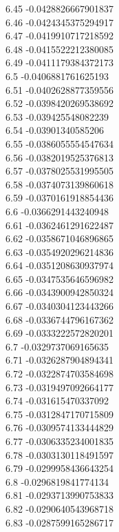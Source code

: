{6.45	-0.0428826667901837\\
6.46	-0.0424345375294917\\
6.47	-0.0419910717218592\\
6.48	-0.0415522212380085\\
6.49	-0.0411179384372173\\
6.5	-0.0406881761625193\\
6.51	-0.0402628877359556\\
6.52	-0.0398420269538692\\
6.53	-0.039425548082239\\
6.54	-0.03901340585206\\
6.55	-0.0386055554547634\\
6.56	-0.0382019525376813\\
6.57	-0.0378025531995505\\
6.58	-0.0374073139860618\\
6.59	-0.0370161918854436\\
6.6	-0.0366291443240948\\
6.61	-0.0362461291622487\\
6.62	-0.0358671046896865\\
6.63	-0.0354920296214836\\
6.64	-0.0351208630937974\\
6.65	-0.0347535646596982\\
6.66	-0.0343900942850324\\
6.67	-0.0340304123443266\\
6.68	-0.0336744796167362\\
6.69	-0.0333222572820201\\
6.7	-0.0329737069165635\\
6.71	-0.0326287904894341\\
6.72	-0.0322874703584698\\
6.73	-0.0319497092664177\\
6.74	-0.031615470337092\\
6.75	-0.0312847170715809\\
6.76	-0.0309574133444829\\
6.77	-0.0306335234001835\\
6.78	-0.0303130118491597\\
6.79	-0.0299958436643254\\
6.8	-0.0296819841774134\\
6.81	-0.0293713990753833\\
6.82	-0.0290640543968718\\
6.83	-0.0287599165286717\\
}
